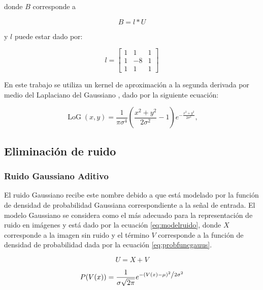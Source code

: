 donde $B$ corresponde a

\begin{equation}
\label{eq:unsharfilter}
B=l*U
\end{equation}

y $l$ puede estar dado por:

\begin{equation} l = \left[
\begin{array}{ccc}
1 & 1 & 1\\
1 & -8 & 1\\
1 & 1 & 1
\end{array}\right]
\end{equation}

En este trabajo se utiliza un kernel de aproximaci\'on a la segunda derivada por medio del Laplaciano del Gaussiano \cite{sotak1989laplacian}, dado por la siguiente ecuaci\'on:

\begin{equation}
\operatorname{LoG}(x,y) = \frac{1}{\pi\sigma^4}\left(\frac{x^2+y^2}{2\sigma^2} - 1\right)e^{-\frac{x^2+y^2}{2\sigma^2}},
\end{equation}


\subsection{Eliminaci\'on de ruido}

\subsubsection{Ruido Gaussiano Aditivo}

El ruido Gaussiano recibe este nombre debido a que est\'a modelado por la funci\'on de densidad de probabilidad Gaussiana correspondiente a la se\~nal de entrada. El modelo Gaussiano se considera como el m\'as adecuado para la representaci\'on de ruido en im\'agenes y est\'a dado por la ecuaci\'on \ref{eq:modelruido}, donde $X$ corresponde a la imagen sin ruido y el t\'ermino $V$ corresponde a la funci\'on de densidad de probabilidad dada por la ecuaci\'on \ref{eq:probfuncgauus}.

\begin{equation}
\label{eq:modelruido}
U = X + V
\end{equation}

\begin{equation}
\label{eq:probfuncgauus}
P(V(x)) = \frac{1}{{\sigma \sqrt {2\pi } }}e^{{{ - \left( {V(x) - \mu } \right)^2 } \mathord{\left/ {\vphantom {{ - \left( {x - \mu } \right)^2 } {2\sigma ^2 }}} \right. \kern-\nulldelimiterspace} {2\sigma ^2 }}}
\end{equation}


